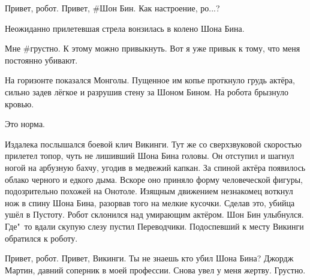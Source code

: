 \begin{dialog}
\X Привет, робот.
\R Привет, \#Шон Бин.
\X Как настроение, ро...?
\end{dialog}

\begin{monolog}
Неожиданно прилетевшая стрела вонзилась в колено Шона Бина.
\end{monolog}

\begin{dialog}
\R Мне \#грустно.
\X К этому можно привыкнуть. Вот я уже привык к тому, что меня постоянно убивают.
\end{dialog}

\begin{monolog}
На горизонте показался Монголы. Пущенное им копье проткнуло грудь актёра, сильно задев лёгкое и разрушив стену за Шоном Бином. На робота брызнуло кровью.
\end{monolog}

\begin{dialog}
\X Это норма.
\end{dialog}

\begin{monolog}
Издалека послышался боевой клич Викинги. Тут же со сверхзвуковой скоростью прилетел топор, чуть не лишивший Шона Бина головы. Он отступил и шагнул ногой на арбузную бахчу, угодив в медвежий капкан. За спиной актёра появилось облако черного и едкого дыма. Вскоре оно приняло форму человеческой фигуры, подозрительно похожей на Онотоле. Изящным движением незнакомец воткнул нож в спину Шона Бина, разорвав того на мелкие кусочки. Сделав это, убийца ушёл в Пустоту. Робот склонился над умирающим актёром. Шон Бин улыбнулся. Где"~то вдали скупую слезу пустил Переводчики. Подоспевший к месту Викинги обратился к роботу.
\end{monolog}

\begin{dialog}
\X Привет, робот.
\R Привет, Викинги. Ты не знаешь кто убил Шона Бина?
\X Джордж Мартин, давний соперник в моей профессии. Снова увел у меня жертву.
\R Грустно.
\end{dialog}